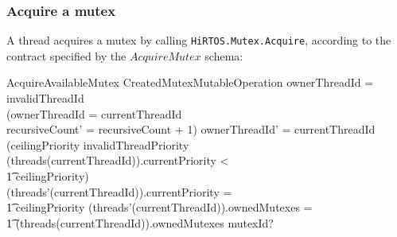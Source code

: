 \documentclass[11pt,letterpaper,twoside,openany]{book}
\begin{document}
\subsubsection{Acquire a mutex}

A thread acquires a mutex by calling \verb`HiRTOS.Mutex.Acquire`, according to the contract
specified by the $AcquireMutex$ schema:

\begin{schema}{AcquireAvailableMutex}
   CreatedMutexMutableOperation
\where
   ownerThreadId = invalidThreadId \lor \\
   (ownerThreadId = currentThreadId \implies \\
    recursiveCount' = recursiveCount + 1)
\also
   ownerThreadId' = currentThreadId
\also
(ceilingPriority \neq invalidThreadPriority \land \\
 (threads(currentThreadId)).currentPriority < \\
 \t1    ceilingPriority) \implies \\
 (threads'(currentThreadId)).currentPriority = \\
 \t1    ceilingPriority
\also
(threads'(currentThreadId)).ownedMutexes = \\
\t1 (threads(currentThreadId)).ownedMutexes \cat \langle mutexId? \rangle
\end{schema}
\end{document}
